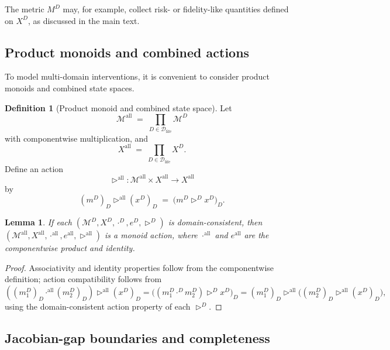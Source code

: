 \documentclass[11pt]{book}
\theoremstyle{plain}
\newtheorem{lemma}[theorem]{Lemma}
\theoremstyle{definition}
\newtheorem{definition}[theorem]{Definition}
\theoremstyle{remark}
\begin{document}
The metric $M^{D}$ may, for example, collect risk- or fidelity-like
quantities defined on $X^{D}$, as discussed in the main text.

\subsection*{Product monoids and combined actions}

To model multi-domain interventions, it is convenient to consider
product monoids and combined state spaces.

\begin{definition}[Product monoid and combined state space]
Let
\[
  \mathcal{M}^{\mathrm{all}}
  \;=\;
  \prod_{D \in \mathcal{D}_{\mathrm{life}}} \mathcal{M}^{D}
\]
with componentwise multiplication, and
\[
  X^{\mathrm{all}}
  \;=\;
  \prod_{D \in \mathcal{D}_{\mathrm{life}}} X^{D}.
\]
Define an action
\[
  \triangleright^{\mathrm{all}} \colon
  \mathcal{M}^{\mathrm{all}} \times X^{\mathrm{all}}
  \to X^{\mathrm{all}}
\]
by
\[
  (m^{D})_{D} \triangleright^{\mathrm{all}} (x^{D})_{D}
  \;=\;
  \bigl( m^{D} \triangleright^{D} x^{D} \bigr)_{D}.
\]
\end{definition}

\begin{lemma}
If each $(\mathcal{M}^{D}, X^{D}, \cdot^{D}, e^{D}, \triangleright^{D})$
is domain-consistent, then
$(\mathcal{M}^{\mathrm{all}}, X^{\mathrm{all}},
  \cdot^{\mathrm{all}}, e^{\mathrm{all}},
  \triangleright^{\mathrm{all}})$
is a monoid action, where $\cdot^{\mathrm{all}}$ and $e^{\mathrm{all}}$
are the componentwise product and identity.
\end{lemma}

\begin{proof}
Associativity and identity properties follow from the componentwise
definition; action compatibility follows from
\[
  ((m^{D}_{1})_{D} \cdot^{\mathrm{all}} (m^{D}_{2})_{D})
  \triangleright^{\mathrm{all}} (x^{D})_{D}
  =
  \bigl( (m^{D}_{1} \cdot^{D} m^{D}_{2})
         \triangleright^{D} x^{D} \bigr)_{D}
  =
  (m^{D}_{1})_{D} \triangleright^{\mathrm{all}}
  \bigl( (m^{D}_{2})_{D} \triangleright^{\mathrm{all}}
         (x^{D})_{D} \bigr),
\]
using the domain-consistent action property of each
$\triangleright^{D}$.
\end{proof}

\subsection*{Jacobian-gap boundaries and completeness}
\end{document}
